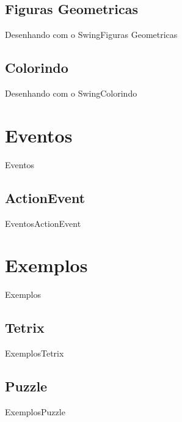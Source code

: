 \documentclass[10pt]{beamer}
\begin{document}
\subsection{Figuras Geometricas}
\begin{frame}{Desenhando com o Swing}{Figuras Geometricas}
\end{frame}{}
\subsection{Colorindo}
\begin{frame}{Desenhando com o Swing}{Colorindo}
\end{frame}{}
\section{Eventos}
\begin{frame}{Eventos}{}
\end{frame}{}
\subsection{ActionEvent}
\begin{frame}{Eventos}{ActionEvent}
\end{frame}{}
\section{Exemplos}
\begin{frame}{Exemplos}{}
\end{frame}{}
\subsection{Tetrix}
\begin{frame}{Exemplos}{Tetrix}
\end{frame}{}
\subsection{Puzzle}
\begin{frame}{Exemplos}{Puzzle}
\end{frame}{}
\end{document}
